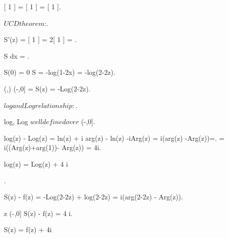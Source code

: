 \documentclass[12pt]{book}
\begin{document}
{{{			 =  = [ 1 ].

			$UCD theorem$:.

			S'(z) = [ 1 ] = 2[ 1 ] = .

			S \in \int {} dx = .

			S(0) = 0 \imp S = -log(1-2x) = -log(2-2z).

			\D(\frac{ 1 }{ 2 },) \cap \mathbb{\C} \setminus (-\infty,0] = \emptyset \imp S(z) = -Log(2-2z).
			
			$log and Log relationship:$.

			log, Log $ well defined over $ \mathbb{\C} \setminus (-\infty,0].

			\all{ z \in \mathbb{\C} \setminus (-\infty,0]}
			{
				log(z) - Log(z) = ln(z) + i arg(z) - ln(z) -iArg(z) = i(arg(z) -Arg(z))=.
				= i((Arg(z)+arg(1))- Arg(z)) = 4\pi i.

				log(z) = Log(z) + 4 \pi i
			}.

			{
				S(z) - f(z) = -Log(2-2z) + log(2-2z) = i(arg(2-2z) - Arg(z)).

				z \in \C \setminus (-\infty,0] \imp S(z) - f(z) = 4 \pi i.

				S(z) = f(z) + 4\pi i
			}

		}
	}
}
\end{document}
